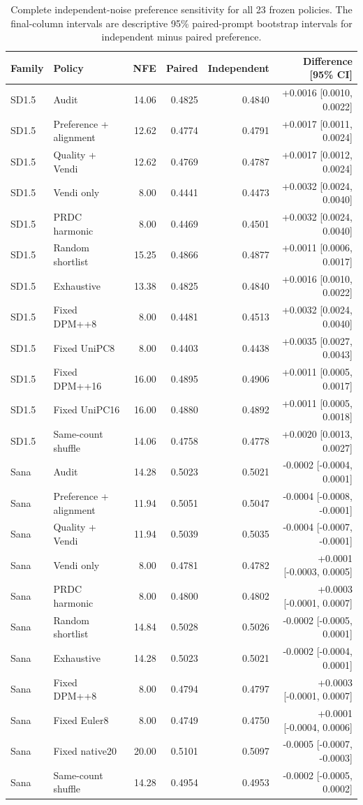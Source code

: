 \begin{table}[tp]
\centering\small
\caption{Complete independent-noise preference sensitivity for all 23 frozen policies. The final-column intervals are descriptive 95\% paired-prompt bootstrap intervals for independent minus paired preference.}
\begin{tabular}{llrrrr}
\toprule Family & Policy & NFE & Paired & Independent & Difference [95\% CI] \\ \midrule
SD1.5 & Audit & 14.06 & 0.4825 & 0.4840 & +0.0016 [0.0010, 0.0022]\\
SD1.5 & Preference + alignment & 12.62 & 0.4774 & 0.4791 & +0.0017 [0.0011, 0.0024]\\
SD1.5 & Quality + Vendi & 12.62 & 0.4769 & 0.4787 & +0.0017 [0.0012, 0.0024]\\
SD1.5 & Vendi only & 8.00 & 0.4441 & 0.4473 & +0.0032 [0.0024, 0.0040]\\
SD1.5 & PRDC harmonic & 8.00 & 0.4469 & 0.4501 & +0.0032 [0.0024, 0.0040]\\
SD1.5 & Random shortlist & 15.25 & 0.4866 & 0.4877 & +0.0011 [0.0006, 0.0017]\\
SD1.5 & Exhaustive & 13.38 & 0.4825 & 0.4840 & +0.0016 [0.0010, 0.0022]\\
SD1.5 & Fixed DPM++8 & 8.00 & 0.4481 & 0.4513 & +0.0032 [0.0024, 0.0040]\\
SD1.5 & Fixed UniPC8 & 8.00 & 0.4403 & 0.4438 & +0.0035 [0.0027, 0.0043]\\
SD1.5 & Fixed DPM++16 & 16.00 & 0.4895 & 0.4906 & +0.0011 [0.0005, 0.0017]\\
SD1.5 & Fixed UniPC16 & 16.00 & 0.4880 & 0.4892 & +0.0011 [0.0005, 0.0018]\\
SD1.5 & Same-count shuffle & 14.06 & 0.4758 & 0.4778 & +0.0020 [0.0013, 0.0027]\\
Sana & Audit & 14.28 & 0.5023 & 0.5021 & -0.0002 [-0.0004, 0.0001]\\
Sana & Preference + alignment & 11.94 & 0.5051 & 0.5047 & -0.0004 [-0.0008, -0.0001]\\
Sana & Quality + Vendi & 11.94 & 0.5039 & 0.5035 & -0.0004 [-0.0007, -0.0001]\\
Sana & Vendi only & 8.00 & 0.4781 & 0.4782 & +0.0001 [-0.0003, 0.0005]\\
Sana & PRDC harmonic & 8.00 & 0.4800 & 0.4802 & +0.0003 [-0.0001, 0.0007]\\
Sana & Random shortlist & 14.84 & 0.5028 & 0.5026 & -0.0002 [-0.0005, 0.0001]\\
Sana & Exhaustive & 14.28 & 0.5023 & 0.5021 & -0.0002 [-0.0004, 0.0001]\\
Sana & Fixed DPM++8 & 8.00 & 0.4794 & 0.4797 & +0.0003 [-0.0001, 0.0007]\\
Sana & Fixed Euler8 & 8.00 & 0.4749 & 0.4750 & +0.0001 [-0.0004, 0.0006]\\
Sana & Fixed native20 & 20.00 & 0.5101 & 0.5097 & -0.0005 [-0.0007, -0.0003]\\
Sana & Same-count shuffle & 14.28 & 0.4954 & 0.4953 & -0.0002 [-0.0005, 0.0002]\\
\bottomrule
\end{tabular}
\end{table}

